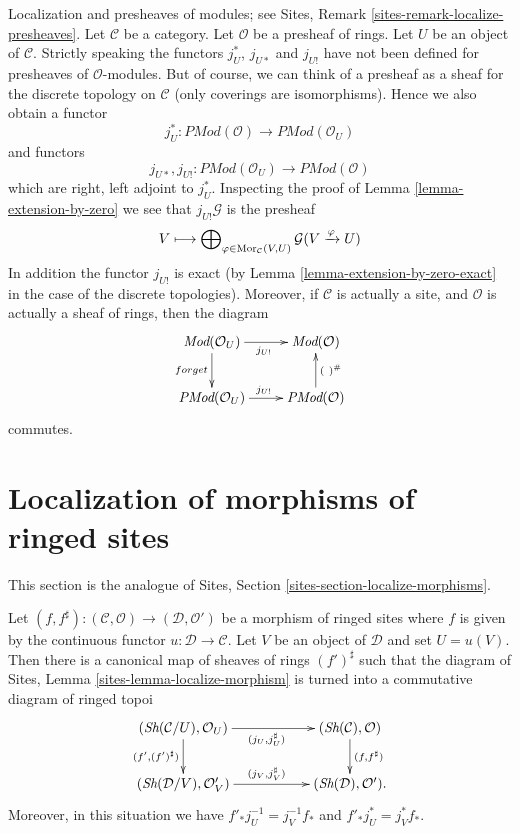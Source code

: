 \begin{remark}
\label{remark-localize-presheaves}
Localization and presheaves of modules; see
Sites, Remark \ref{sites-remark-localize-presheaves}.
Let $\mathcal{C}$ be a category.
Let $\mathcal{O}$ be a presheaf of rings.
Let $U$ be an object of $\mathcal{C}$.
Strictly speaking the functors $j_U^*$, $j_{U*}$ and $j_{U!}$
have not been defined for presheaves of $\mathcal{O}$-modules.
But of course, we can think of a presheaf as a sheaf for the
discrete topology on $\mathcal{C}$ (only coverings are isomorphisms).
Hence we also obtain a functor
$$
j_U^* :
\textit{PMod}(\mathcal{O})
\longrightarrow
\textit{PMod}(\mathcal{O}_U)
$$
and functors
$$
j_{U*}, j_{U!} :
\textit{PMod}(\mathcal{O}_U)
\longrightarrow
\textit{PMod}(\mathcal{O})
$$
which are right, left adjoint to $j_U^*$. Inspecting the proof of
Lemma \ref{lemma-extension-by-zero} we see that $j_{U!}\mathcal{G}$
is the presheaf
$$
V \longmapsto
\bigoplus\nolimits_{\varphi \in \mathop{\rm Mor}\nolimits_\mathcal{C}(V, U)}
\mathcal{G}(V \xrightarrow{\varphi} U)
$$
In addition the functor $j_{U!}$ is exact (by
Lemma \ref{lemma-extension-by-zero-exact} in the
case of the discrete topologies). Moreover, if $\mathcal{C}$
is actually a site, and $\mathcal{O}$ is actually a sheaf of rings,
then the diagram
$$
\xymatrix{
\textit{Mod}(\mathcal{O}_U) \ar[r]_{j_{U!}} \ar[d]_{forget} &
\textit{Mod}(\mathcal{O}) \\
\textit{PMod}(\mathcal{O}_U) \ar[r]^{j_{U!}} &
\textit{PMod}(\mathcal{O}) \ar[u]_{(\ )^\#}
}
$$
commutes.
\end{remark}









\section{Localization of morphisms of ringed sites}
\label{section-localize-morphisms}

\noindent
This section is the analogue of
Sites, Section \ref{sites-section-localize-morphisms}.

\begin{lemma}
\label{lemma-localize-morphism-ringed-sites}
Let
$(f, f^\sharp) :
(\mathcal{C}, \mathcal{O})
\longrightarrow
(\mathcal{D}, \mathcal{O}')$
be a morphism of ringed sites where $f$ is given by the continuous
functor $u : \mathcal{D} \to \mathcal{C}$.
Let $V$ be an object of $\mathcal{D}$ and set $U = u(V)$.
Then there is a canonical map of sheaves of rings $(f')^\sharp$
such that the diagram of
Sites, Lemma \ref{sites-lemma-localize-morphism}
is turned into a commutative diagram of ringed topoi
$$
\xymatrix{
(\Sh(\mathcal{C}/U), \mathcal{O}_U)
\ar[rr]_{(j_U, j_U^\sharp)} \ar[d]_{(f', (f')^\sharp)} & &
(\Sh(\mathcal{C}), \mathcal{O})
\ar[d]^{(f, f^\sharp)} \\
(\Sh(\mathcal{D}/V), \mathcal{O}'_V)
\ar[rr]^{(j_V, j_V^\sharp)} & &
(\Sh(\mathcal{D}), \mathcal{O}').
}
$$
Moreover, in this situation we have $f'_*j_U^{-1} = j_V^{-1}f_*$
and $f'_*j_U^* = j_V^*f_*$.
\end{lemma}

